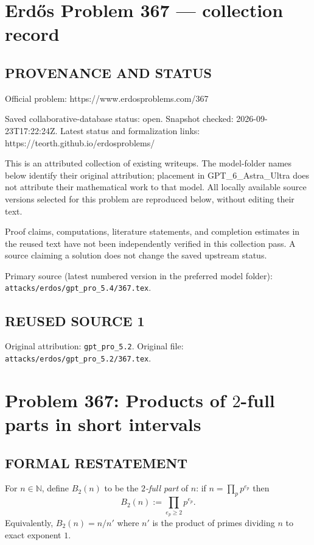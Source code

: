 \section*{Erd\H{o}s Problem 367 --- collection record}

\subsection*{PROVENANCE AND STATUS}
Official problem: https://www.erdosproblems.com/367

Saved collaborative-database status: open.
Snapshot checked: 2026-09-23T17:22:24Z.
Latest status and formalization links: https://teorth.github.io/erdosproblems/

This is an attributed collection of existing writeups. The model-folder names below identify their original attribution; placement in GPT\_6\_Astra\_Ultra does not attribute their mathematical work to that model. All locally available source versions selected for this problem are reproduced below, without editing their text.

Proof claims, computations, literature statements, and completion estimates in the reused text have not been independently verified in this collection pass. A source claiming a solution does not change the saved upstream status.

Primary source (latest numbered version in the preferred model folder): \texttt{attacks/erdos/gpt\_pro\_5.4/367.tex}.

\subsection*{REUSED SOURCE 1}
Original attribution: \texttt{gpt\_pro\_5.2}.
Original file: \texttt{attacks/erdos/gpt\_pro\_5.2/367.tex}.

\section*{Problem 367: Products of $2$-full parts in short intervals}

\subsection*{FORMAL RESTATEMENT}
For $n\in\mathbb{N}$, define $B_2(n)$ to be the \emph{$2$-full part} of $n$: if $n=\prod_p p^{e_p}$ then
\[
B_2(n) := \prod_{e_p\ge 2} p^{e_p}.
\]
Equivalently, $B_2(n)=n/n'$ where $n'$ is the product of primes dividing $n$ to exact exponent $1$.


